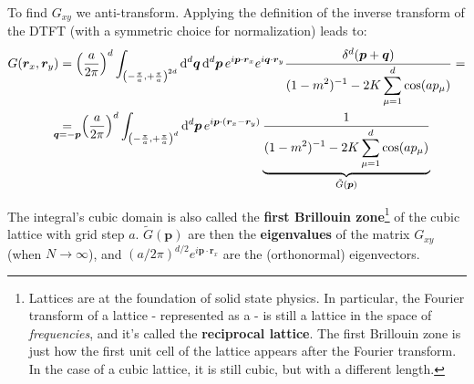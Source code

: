 \documentclass[../../main.tex]{subfiles}
\begin{document}
To find $G_{xy}$ we anti-transform. Applying the definition of the inverse transform of the DTFT (with a symmetric choice for normalization) leads to:
\begin{align}\nonumber
    G(\bm{r}_x, \bm{r}_y) &= \left(\frac{a}{2\pi} \right)^{d} \int_{\left(-\frac{\pi}{a}, +\frac{\pi}{a} \right)^{2d}} \dd[d]{\bm{q}}  \dd[d]{\bm{p}} 
    e^{i \bm{p} \cdot \bm{r}_x} e^{i \bm{q} \cdot \bm{r}_y}
    \frac{ \delta^d(\bm{p}+ \bm{q})}{\displaystyle (1-m^2)^{-1} - 2K \sum_{\mu=1}^d \cos(a p_\mu)}  =\\
    &\underset{\mathclap{\bm{q} = -\bm{p}}}{=}\>\> \left(\frac{a}{2\pi} \right)^{d} \int_{\left(-\frac{\pi}{a},+\frac{\pi}{a}  \right)^d} \dd[d]{\bm{p}} e^{i \bm{p} \cdot (\bm{r}_x - \bm{r}_y)} \underbrace{\frac{1}{\displaystyle (1-m^2)^{-1} - 2K \sum_{\mu=1}^d \cos(a p_\mu)}}_{\tilde{G}(\bm{p})} \label{eqn:G-eigenvalue}
\end{align}


The integral's cubic domain is also called the \textbf{first Brillouin zone}\footnote{Lattices are at the foundation of solid state physics. In particular, the Fourier transform of a lattice - represented as a  - is still a lattice in the space of \textit{frequencies}, and it's called the \textbf{reciprocal lattice}. The first Brillouin zone is just how the first unit cell of the lattice appears after the Fourier transform. In the case of a cubic lattice, it is still cubic, but with a different length.} of the cubic lattice with grid step $a$. $\tilde{G}(\bm{p})$ are then the \textbf{eigenvalues} of the matrix $G_{xy}$ (when $N \to \infty$), and $(a/2\pi)^{d/2} e^{i \bm{p}\cdot \bm{r}_x}$ are the (orthonormal) eigenvectors.

\end{document}

